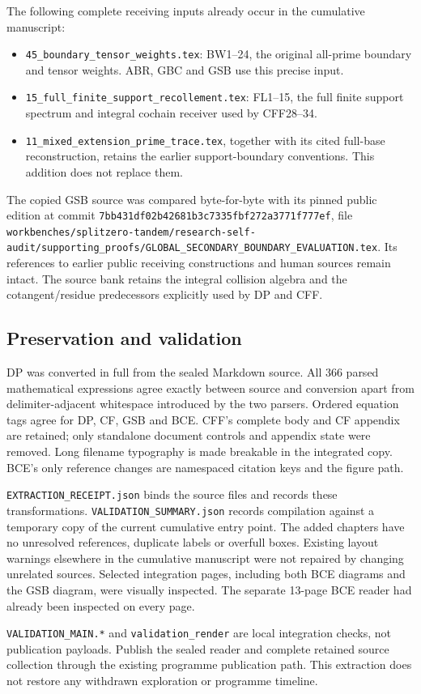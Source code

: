\documentclass[
]{article}
\providecommand{\tightlist}{%
  \setlength{\itemsep}{0pt}\setlength{\parskip}{0pt}}
\begin{document}
The following complete receiving inputs already occur in the cumulative
manuscript:

\begin{itemize}
\tightlist
\item
  \texttt{45\_boundary\_tensor\_weights.tex}: BW1--24, the original
  all-prime boundary and tensor weights. ABR, GBC and GSB use this
  precise input.
\item
  \texttt{15\_full\_finite\_support\_recollement.tex}: FL1--15, the full
  finite support spectrum and integral cochain receiver used by
  CFF28--34.
\item
  \texttt{11\_mixed\_extension\_prime\_trace.tex}, together with its
  cited full-base reconstruction, retains the earlier support-boundary
  conventions. This addition does not replace them.
\end{itemize}

The copied GSB source was compared byte-for-byte with its pinned public
edition at commit \texttt{7bb431df02b42681b3c7335fbf272a3771f777ef},
file
\texttt{workbenches/splitzero-tandem/research-self-audit/supporting\_proofs/GLOBAL\_SECONDARY\_BOUNDARY\_EVALUATION.tex}.
Its references to earlier public receiving constructions and human
sources remain intact. The source bank retains the integral collision
algebra and the cotangent/residue predecessors explicitly used by DP and
CFF.

\subsection{Preservation and
validation}\label{preservation-and-validation}

DP was converted in full from the sealed Markdown source. All 366 parsed
mathematical expressions agree exactly between source and conversion
apart from delimiter-adjacent whitespace introduced by the two parsers.
Ordered equation tags agree for DP, CF, GSB and BCE. CFF's complete body
and CF appendix are retained; only standalone document controls and
appendix state were removed. Long filename typography is made breakable
in the integrated copy. BCE's only reference changes are namespaced
citation keys and the figure path.

\texttt{EXTRACTION\_RECEIPT.json} binds the source files and records
these transformations. \texttt{VALIDATION\_SUMMARY.json} records
compilation against a temporary copy of the current cumulative entry
point. The added chapters have no unresolved references, duplicate
labels or overfull boxes. Existing layout warnings elsewhere in the
cumulative manuscript were not repaired by changing unrelated sources.
Selected integration pages, including both BCE diagrams and the GSB
diagram, were visually inspected. The separate 13-page BCE reader had
already been inspected on every page.

\texttt{VALIDATION\_MAIN.*} and \texttt{validation\_render} are local
integration checks, not publication payloads. Publish the sealed reader
and complete retained source collection through the existing programme
publication path. This extraction does not restore any withdrawn
exploration or programme timeline.
\end{document}
